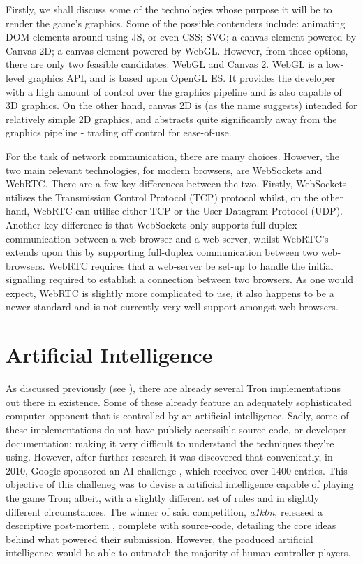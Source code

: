 \documentclass[class=article, crop=false]{standalone}
\begin{document}
		Firstly, we shall discuss some of the technologies whose purpose it will be to render the game's graphics. Some of the possible contenders include: animating DOM elements around using JS, or even CSS; SVG; a canvas element powered by Canvas 2D; a canvas element powered by WebGL. However, from those options, there are only two feasible candidates: WebGL and Canvas 2. WebGL is a low-level graphics API, and is based upon OpenGL ES. It provides the developer with a high amount of control over the graphics pipeline and is also capable of 3D graphics. On the other hand, canvas 2D is (as the name suggests) intended for relatively simple 2D graphics, and abstracts quite significantly away from the graphics pipeline - trading off control for ease-of-use.

		For the task of network communication, there are many choices. However, the two main relevant technologies, for modern browsers, are WebSockets and WebRTC. There are a few key differences between the two. Firstly, WebSockets utilises the Transmission Control Protocol (TCP) protocol whilst, on the other hand, WebRTC can utilise either TCP or the User Datagram Protocol (UDP). Another key difference is that WebSockets only supports full-duplex communication between a web-browser and a web-server, whilst WebRTC's extends upon this by supporting full-duplex communication between two web-browsers. WebRTC requires that a web-server be set-up to handle the initial signalling required to establish a connection between two browsers. As one would expect, WebRTC is slightly more complicated to use, it also happens to be a newer standard and is not currently very well support amongst web-browsers.

	\section{Artificial Intelligence} \label{sec:background-google-ai}
		As discussed previously (see ), there are already several Tron implementations out there in existence. Some of these already feature an adequately sophisticated computer opponent that is controlled by an artificial intelligence. Sadly, some of these implementations do not have publicly accessible source-code, or developer documentation; making it very difficult to understand the techniques they're using. However, after further research it was discovered that conveniently, in 2010, Google sponsored an AI challenge \parencite{GoogleTronAi}, which received over 1400 entries. This objective of this challeneg was to devise a artificial intelligence capable of playing the game Tron; albeit, with a slightly different set of rules and in slightly different circumstances. The winner of said competition, \emph{a1k0n}, released a descriptive post-mortem \parencite{TronPostMortem}, complete with source-code, detailing the core ideas behind what powered their submission. However, the produced artificial intelligence would be able to outmatch the majority of human controller players.
\end{document}
